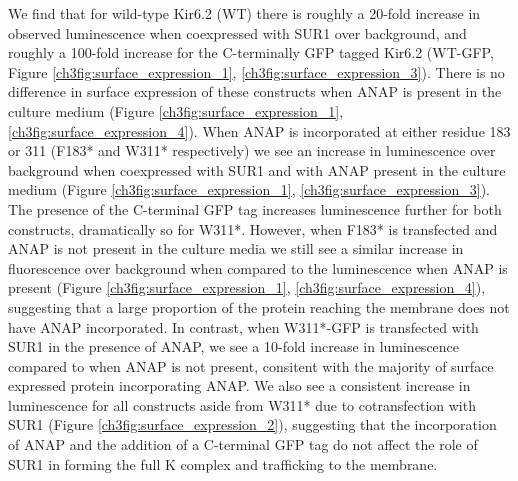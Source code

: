 We find that for wild-type Kir6.2 (WT) there is roughly a 20-fold increase in observed luminescence when coexpressed with SUR1 over background, and roughly a 100-fold increase for the C-terminally GFP tagged Kir6.2 (WT-GFP, Figure \ref{ch3fig:surface_expression_1}, \ref{ch3fig:surface_expression_3}).
There is no difference in surface expression of these constructs when ANAP is present in the culture medium (Figure \ref{ch3fig:surface_expression_1}, \ref{ch3fig:surface_expression_4}).
When ANAP is incorporated at either residue 183 or 311 (F183* and W311* respectively) we see an increase in luminescence over background when coexpressed with SUR1 and with ANAP present in the culture medium (Figure \ref{ch3fig:surface_expression_1}, \ref{ch3fig:surface_expression_3}).
The presence of the C-terminal GFP tag increases luminescence further for both constructs, dramatically so for W311*.
However, when F183* is transfected and ANAP is not present in the culture media we still see a similar increase in fluorescence over background when compared to the luminescence when ANAP is present (Figure \ref{ch3fig:surface_expression_1}, \ref{ch3fig:surface_expression_4}), suggesting that a large proportion of the protein reaching the membrane does not have ANAP incorporated.
In contrast, when W311*-GFP is transfected with SUR1 in the presence of ANAP, we see a 10-fold increase in luminescence compared to when ANAP is not present, consitent with the majority of surface expressed protein incorporating ANAP.
We also see a consistent increase in luminescence for all constructs aside from W311* due to cotransfection with SUR1 (Figure \ref{ch3fig:surface_expression_2}), suggesting that the incorporation of ANAP and the addition of a C-terminal GFP tag do not affect the role of SUR1 in forming the full K\ATP{} complex and trafficking to the membrane.


